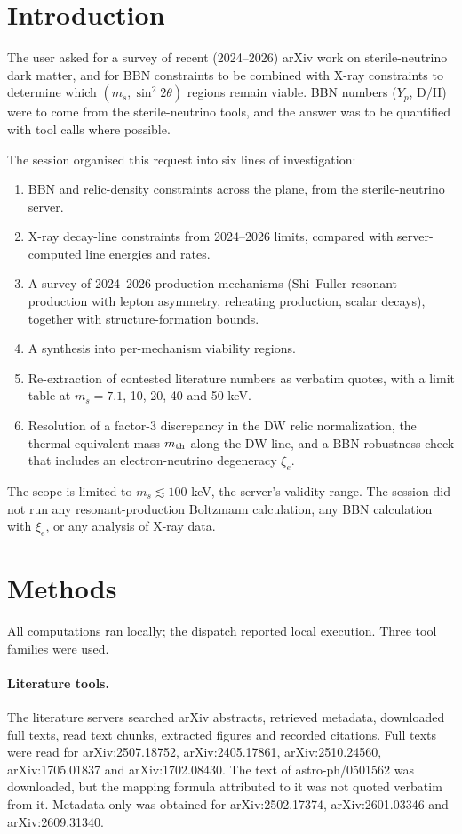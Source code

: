 \documentclass[11pt,a4paper]{article}
\begin{document}
\section{Introduction}
The user asked for a survey of recent (2024--2026) arXiv work on sterile-neutrino dark matter, and for BBN constraints to be combined with X-ray constraints to determine which $(m_s,\sin^2 2\theta)$ regions remain viable. BBN numbers ($Y_p$, D/H) were to come from the sterile-neutrino tools, and the answer was to be quantified with tool calls where possible.

The session organised this request into six lines of investigation:
\begin{enumerate}
\item BBN and relic-density constraints across the plane, from the sterile-neutrino server.
\item X-ray decay-line constraints from 2024--2026 limits, compared with server-computed line energies and rates.
\item A survey of 2024--2026 production mechanisms (Shi--Fuller resonant production with lepton asymmetry, reheating production, scalar decays), together with structure-formation bounds.
\item A synthesis into per-mechanism viability regions.
\item Re-extraction of contested literature numbers as verbatim quotes, with a limit table at $m_s=7.1$, 10, 20, 40 and 50 keV.
\item Resolution of a factor-3 discrepancy in the DW relic normalization, the thermal-equivalent mass $m_{\rm th}$ along the DW line, and a BBN robustness check that includes an electron-neutrino degeneracy $\xi_e$.
\end{enumerate}

The scope is limited to $m_s\lesssim100$ keV, the server's validity range. The session did not run any resonant-production Boltzmann calculation, any BBN calculation with $\xi_e$, or any analysis of X-ray data.

\section{Methods}
All computations ran locally; the dispatch reported local execution. Three tool families were used.

\paragraph{Literature tools.} The literature servers searched arXiv abstracts, retrieved metadata, downloaded full texts, read text chunks, extracted figures and recorded citations. Full texts were read for arXiv:2507.18752, arXiv:2405.17861, arXiv:2510.24560, arXiv:1705.01837 and arXiv:1702.08430. The text of astro-ph/0501562 was downloaded, but the mapping formula attributed to it was not quoted verbatim from it. Metadata only was obtained for arXiv:2502.17374, arXiv:2601.03346 and arXiv:2609.31340.
\end{document}
